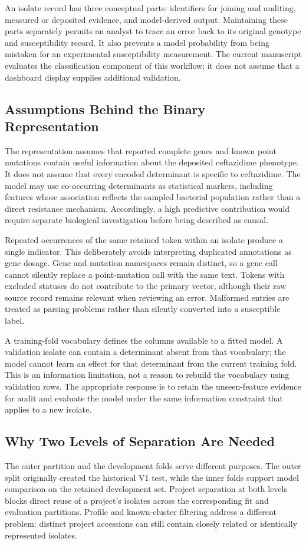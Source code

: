An isolate record has three conceptual parts: identifiers for joining and auditing, measured or deposited evidence, and model-derived output. Maintaining these parts separately permits an analyst to trace an error back to its original genotype and susceptibility record. It also prevents a model probability from being mistaken for an experimental susceptibility measurement. The current manuscript evaluates the classification component of this workflow; it does not assume that a dashboard display supplies additional validation.

\subsection{Assumptions Behind the Binary Representation}
The representation assumes that reported complete genes and known point mutations contain useful information about the deposited ceftazidime phenotype. It does not assume that every encoded determinant is specific to ceftazidime. The model may use co-occurring determinants as statistical markers, including features whose association reflects the sampled bacterial population rather than a direct resistance mechanism. Accordingly, a high predictive contribution would require separate biological investigation before being described as causal.

Repeated occurrences of the same retained token within an isolate produce a single indicator. This deliberately avoids interpreting duplicated annotations as gene dosage. Gene and mutation namespaces remain distinct, so a gene call cannot silently replace a point-mutation call with the same text. Tokens with excluded statuses do not contribute to the primary vector, although their raw source record remains relevant when reviewing an error. Malformed entries are treated as parsing problems rather than silently converted into a susceptible label.

A training-fold vocabulary defines the columns available to a fitted model. A validation isolate can contain a determinant absent from that vocabulary; the model cannot learn an effect for that determinant from the current training fold. This is an information limitation, not a reason to rebuild the vocabulary using validation rows. The appropriate response is to retain the unseen-feature evidence for audit and evaluate the model under the same information constraint that applies to a new isolate.

\subsection{Why Two Levels of Separation Are Needed}
The outer partition and the development folds serve different purposes. The outer split originally created the historical V1 test, while the inner folds support model comparison on the retained development set. Project separation at both levels blocks direct reuse of a project's isolates across the corresponding fit and evaluation partitions. Profile and known-cluster filtering address a different problem: distinct project accessions can still contain closely related or identically represented isolates.

